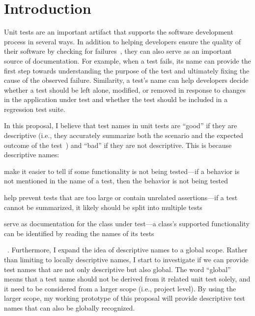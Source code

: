 \documentclass[proposal.tex]{subfiles}
\begin{document}
\newpage
\section{Introduction}
\label{sec:introduction}


Unit tests are an important artifact that supports the software development process in several ways.
%
In addition to helping developers ensure the quality of their software by checking for failures~\cite{daka2014survey}, they can also serve as an important source of documentation.
%
For example, when a test fails, its name can provide the first step towards understanding the purpose of the test and ultimately fixing the cause of the observed failure.
%
Similarity, a test's name can help developers decide whether a test should be left alone, modified, or removed in response to changes in the application under test and whether the test should be included in a regression test suite.


In this proposal, I believe that test names in unit tests are \enquote{good} if they are descriptive (i.e., they accurately summarize both the scenario and the expected outcome of the test~\cite{trenk14}) and \enquote{bad} if they are not descriptive.
%
This is because descriptive names:
\begin{enumerate*}
\item make it easier to tell if some functionality is not being tested---if a behavior is not mentioned in the name of a test, then the behavior is not being tested
\item help prevent tests that are too large or contain unrelated assertions---if a test cannot be summarized, it likely should be split into multiple tests
\item serve as documentation for the class under test---a class's supported functionality can be identified by reading the names of its tests
\end{enumerate*}~\cite{zhang2015automatically}.
%
Furthermore, I expand the idea of descriptive names to a global scope.
%
Rather than limiting to locally descriptive names, I start to investigate if we can provide test names that are not only descriptive but also global.
%
The word \enquote{global} means that a test name should not be derived from it related unit test solely, and it need to be considered from a larger scope (i.e., project level).
%
By using the larger scope, my working prototype of this proposal will provide descriptive test names that can also be globally recognized.
\end{document}
